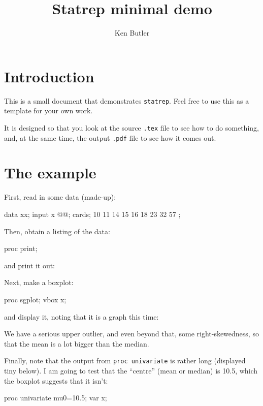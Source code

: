 \documentclass{article}
\title{Statrep minimal demo}
\author{Ken Butler}
\date{}
\begin{document}
\maketitle

\section{Introduction}

This is a small document that demonstrates \texttt{statrep}. Feel free
to use this as a template for your own work.

It is designed so that you look at the source \texttt{.tex} file to
see how to do something, and, at the same time, the output
\texttt{.pdf} file to see how it comes out.

\section{The example}



First, read in some data (made-up):

\begin{Datastep}
data xx;
  input x @@;
  cards;
  10 11 14 15 16 18 23 32 57
  ;
\end{Datastep}

Then, obtain a listing of the data:

\begin{Sascode}[store=a]
proc print;  
\end{Sascode}

and print it out:


Next, make a boxplot:

\begin{Sascode}[store=b]
proc sgplot;
  vbox x;
\end{Sascode}

and display it, noting that it is a graph this time:


We have a serious upper outlier, and even beyond that, some
right-skewedness, so that the mean is a lot bigger than the median.

Finally, note that the output from \texttt{proc univariate} is rather
long (displayed tiny below). I am going to test that the ``centre''
(mean or median) is 10.5, which the boxplot suggests that it isn't:

\begin{Sascode}[store=c]
proc univariate mu0=10.5;
  var x;
\end{Sascode}
\end{document}
